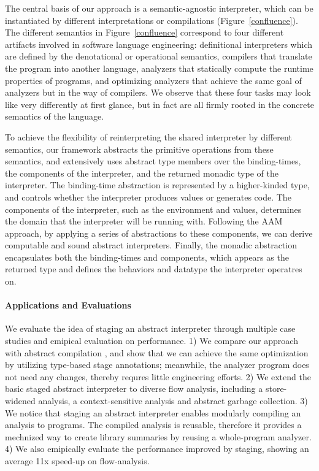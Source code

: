The central basis of our approach is a semantic-agnostic interpreter, which can be
instantiated by different interpretations or compilations (Figure~\ref{confluence}).
The different semantics in Figure~\ref{confluence} correspond to four different
artifacts involved in software language engineering: definitional interpreters
which are defined by the denotational or operational semantics, compilers that
translate the program into another language, analyzers that statically compute the
runtime properties of programs, and optimizing analyzers that achieve the same goal
of analyzers but in the way of compilers. We observe that these four
tasks may look like very differently at first glance, but in fact are
all firmly rooted in the concrete semantics of the language.

To achieve the flexibility of reinterpreting the shared interpreter by
different semantics, our framework abstracts the primitive operations
from these semantics, and extensively uses abstract type members over
the binding-times, the components of the interpreter, and the returned
monadic type of the interpreter. The binding-time abstraction is
represented by a higher-kinded type, and controls whether the
interpreter produces values or generates code. The components of the
interpreter, such as the environment and values, determines the domain
that the interpreter will be running with. Following the AAM approach,
by applying a series of abstractions to these components, we can
derive computable and sound abstract interpreters. Finally, the
monadic abstraction encapsulates both the binding-times and
components, which appears as the returned type and defines the
behaviors and datatype the interpreter operatres on.

\paragraph{Applications and Evaluations}
We evaluate the idea of staging an abstract interpreter through
multiple case studies and emipical evaluation on performance.
1) We compare our approach with abstract compilation
\cite{Boucher:1996:ACN:647473.727587}, and show that we can achieve
the same optimization by utilizing type-based stage annotations;
meanwhile, the analyzer program does not need any changes, thereby
requres little engineering efforts.
2) We extend the basic staged abstract interpreter to diverse flow
analysis, including a store-widened analysis, a context-sensitive
analysis and abstract garbage collection.
3) We notice that staging an abstract interpreter enables modularly
compiling an analysis to programs. The compiled analysis is reusable,
therefore it provides a mechnized way to create library summaries by
reusing a whole-program analyzer.
4) We also emipically evaluate the performance improved by staging,
showing an average 11x speed-up on flow-analysis.

